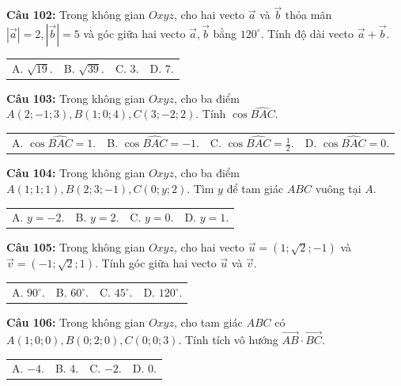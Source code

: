 \documentclass[12pt]{article}
\begin{document}
	\vspace{2mm}
	\noindent \textbf{Câu 102:} Trong không gian $Oxyz$, cho hai vecto $\vec{a}$ và $\vec{b}$ thỏa mãn $|\vec{a}| = 2, |\vec{b}| = 5$ và góc giữa hai vecto $\vec{a}, \vec{b}$ bằng $120^\circ$. Tính độ dài vecto $\vec{a} + \vec{b}$. \\
	\noindent
	\begin{tabular}{p{} p{} p{} p{}}
		A. $\sqrt{19}$. & B. $\sqrt{39}$. & C. $3$. & D. $7$.
	\end{tabular}
	
	\vspace{2mm}
	\noindent \textbf{Câu 103:} Trong không gian $Oxyz$, cho ba điểm $A(2; -1; 3), B(1; 0; 4), C(3; -2; 2)$. Tính $\cos \widehat{BAC}$. \\
	\noindent
	\begin{tabular}{p{} p{} p{} p{}}
		A. $\cos \widehat{BAC} = 1$. & B. $\cos \widehat{BAC} = -1$. & C. $\cos \widehat{BAC} = \frac{1}{2}$. & D. $\cos \widehat{BAC} = 0$.
	\end{tabular}
	
	\vspace{2mm}
	\noindent \textbf{Câu 104:} Trong không gian $Oxyz$, cho ba điểm $A(1; 1; 1), B(2; 3; -1), C(0; y; 2)$. Tìm $y$ để tam giác $ABC$ vuông tại $A$. \\
	\noindent
	\begin{tabular}{p{} p{} p{} p{}}
		A. $y = -2$. & B. $y = 2$. & C. $y = 0$. & D. $y = 1$.
	\end{tabular}
	
	\vspace{2mm}
	\noindent \textbf{Câu 105:} Trong không gian $Oxyz$, cho hai vecto $\vec{u} = (1; \sqrt{2}; -1)$ và $\vec{v} = (-1; \sqrt{2}; 1)$. Tính góc giữa hai vecto $\vec{u}$ và $\vec{v}$. \\
	\noindent
	\begin{tabular}{p{} p{} p{} p{}}
		A. $90^\circ$. & B. $60^\circ$. & C. $45^\circ$. & D. $120^\circ$.
	\end{tabular}
	
	\vspace{2mm}
	\noindent \textbf{Câu 106:} Trong không gian $Oxyz$, cho tam giác $ABC$ có $A(1; 0; 0), B(0; 2; 0), C(0; 0; 3)$. Tính tích vô hướng $\vec{AB} \cdot \vec{BC}$. \\
	\noindent
	\begin{tabular}{p{} p{} p{} p{}}
		A. $-4$. & B. $4$. & C. $-2$. & D. $0$.
	\end{tabular}
	
\end{document}
